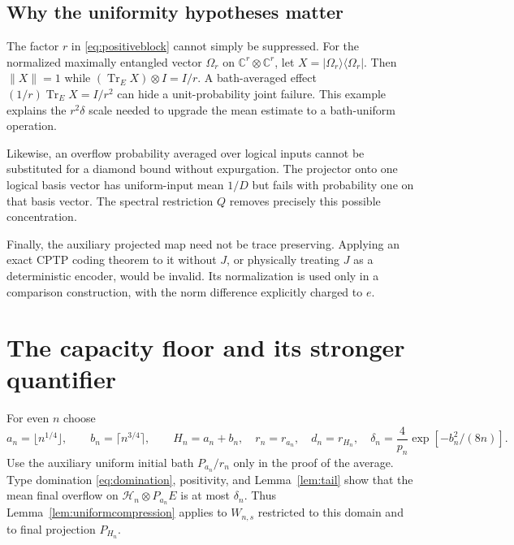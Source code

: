 \documentclass[11pt]{article}
\newcommand{\Tr}{\operatorname{Tr}}
\newcommand{\ket}[1]{\lvert #1\rangle}
\newcommand{\bra}[1]{\langle #1\rvert}
\newcommand{\norm}[1]{\lVert #1\rVert}
\begin{document}
\subsection{Why the uniformity hypotheses matter}

The factor $r$ in \eqref{eq:positiveblock} cannot simply be suppressed. For the normalized maximally entangled vector $\Omega_r$ on $\mathbb C^r\otimes\mathbb C^r$, let $X=\ket{\Omega_r}\bra{\Omega_r}$. Then $\norm X=1$ while $(\Tr_E X)\otimes I=I/r$. A bath-averaged effect $(1/r)\Tr_E X=I/r^2$ can hide a unit-probability joint failure. This example explains the $r^2\delta$ scale needed to upgrade the mean estimate to a bath-uniform operation.

Likewise, an overflow probability averaged over logical inputs cannot be substituted for a diamond bound without expurgation. The projector onto one logical basis vector has uniform-input mean $1/D$ but fails with probability one on that basis vector. The spectral restriction $Q$ removes precisely this possible concentration.

Finally, the auxiliary projected map need not be trace preserving. Applying an exact CPTP coding theorem to it without $J$, or physically treating $J$ as a deterministic encoder, would be invalid. Its normalization is used only in a comparison construction, with the norm difference explicitly charged to $e$.

\section{The capacity floor and its stronger quantifier}\label{sec:floor}

For even $n$ choose
\begin{equation}
 a_n=\lfloor n^{1/4}\rfloor,\qquad b_n=\lceil n^{3/4}\rceil,
 \qquad H_n=a_n+b_n,
 \quad r_n=r_{a_n},\quad d_n=r_{H_n},
 \quad \delta_n=\frac4{p_n}\exp[-b_n^2/(8n)].
 \label{eq:scales}
\end{equation}
Use the auxiliary uniform initial bath $P_{a_n}/r_n$ only in the proof of the average. Type domination \eqref{eq:domination}, positivity, and Lemma~\ref{lem:tail} show that the mean final overflow on $\mathcal H_n\otimes P_{a_n}E$ is at most $\delta_n$. Thus Lemma~\ref{lem:uniformcompression} applies to $W_{n,s}$ restricted to this domain and to final projection $P_{H_n}$.
\end{document}
